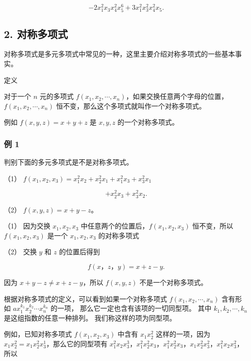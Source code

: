 \[
- 2 x _ {1} ^ {2} x _ {3} x _ {4} ^ {2} x _ {5} ^ {6} + 3 x _ {1} ^ {2} x _ {3} ^ {2} x _ {4} ^ {2} x _ {5}.
\]

\subsection{2. 对称多项式}

对称多项式是多元多项式中常见的一种，这里主要介绍对称多项式的一些基本事实。

定义

对于一个 \(n\) 元的多项式
\(f(x_{1}, x_{2}, \cdots, x_{n})\)，如果交换任意两个字母的位置，\(f(x_{1}, x_{2}, \cdots, x_{n})\)
恒不变，那么这个多项式就叫作一个对称多项式。

例如 \(f(x, y, z) = x + y + z\) 是 \(x, y, z\) 的一个对称多项式。

\subsubsection{例 1}

判别下面的多元多项式是不是对称多项式。

（1）
\(f(x_{1}, x_{2}, x_{3}) = x_{1}^{2}x_{2} + x_{2}^{2}x_{1} + x_{1}^{2}x_{3} + x_{3}^{2}x_{1}\)

\[
+ x _ {2} ^ {2} x _ {3} + x _ {3} ^ {2} x _ {2}.
\]

（2） \(f(x, y, z) = x + y - z\)。

 （1） 因为交换 \(x_{1}, x_{2}, x_{3}\)
中任意两个的位置后，\(f(x_{1}, x_{2}, x_{3})\) 恒不变，所以
\(f(x_{1}, x_{2}, x_{3})\) 是一个 \(x_{1}, x_{2}, x_{3}\) 的对称多项式

（2） 交换 \(y\) 和 \(z\) 的位置后得到

\[
f (x\text{，} z\text{，} y) = x + z - y.
\]

因为 \(x + y - z \neq x + z - y\)，所以 \(f(x, y, z)\)
不是一个对称多项式。

{\small
根据对称多项式的定义，可以看到如果一个对称多项式
\(f(x_{1}, x_{2}, \cdots, x_{n})\)
含有形如 \(ax_{1}^{k_{1}} x_{2}^{k_{2}} \cdots x_{n}^{k_{n}}\) 的一项，
那么它一定也含有该项的一切同型项。
其中 \(k_{1}, k_{2}, \cdots, k_{n}\) 是这组指数的任意一种排列。
我们称这样的项为同型项。
}

例如，已知对称多项式 \(f(x_{1}, x_{2}, x_{3})\) 中含有
\(x_{1}x_{2}^{2}\) 这样的一项，因为
\(x_{1}x_{2}^{2} = x_{1}x_{2}^{2}x_{3}^{1}\)，那么它的同型项有
\(x_{1}^{2}x_{2}x_{3}^{3}\)，\(x_{1}^{2}x_{2}^{2}x_{3}\)，\(x_{1}^{2}x_{2}^{2}x_{3}\)，\(x_{1}x_{2}^{2}x_{3}^{2}\)，\(x_{1}^{2}x_{2}x_{3}^{2}\)，所以

